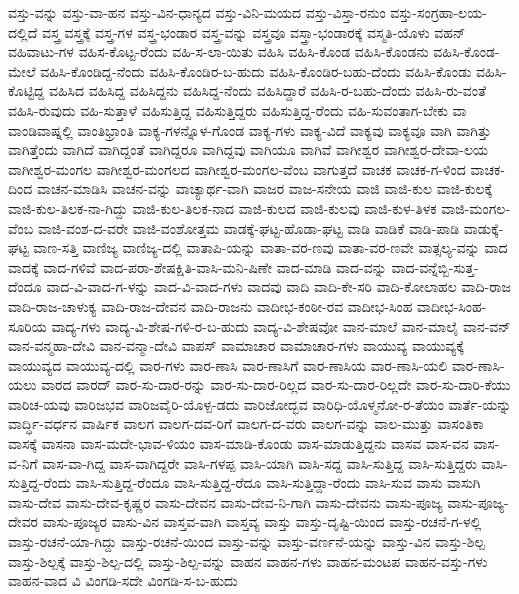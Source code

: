 ವಸ್ತು-ವನ್ನು
ವಸ್ತು-ವಾ-ಹನ
ವಸ್ತು-ವಿನ-ಧಾನ್ಯದ
ವಸ್ತು-ವಿನಿ-ಮಯದ
ವಸ್ತು-ವಿಸ್ತಾ-ರನುಂ
ವಸ್ತು-ಸಂಗ್ರಹಾ-ಲಯ-ದಲ್ಲಿದೆ
ವಸ್ತ್ರ
ವಸ್ತ್ರಕ್ಕೆ
ವಸ್ತ್ರ-ಗಳ
ವಸ್ತ್ರ-ಭಂಡಾರ
ವಸ್ತ್ರ-ವನ್ನು
ವಸ್ತ್ರವೂ
ವಸ್ತ್ರಾ-ಭಂಡಾರಕ್ಕೆ
ವಸ್ಮತಿ-ಯೊಳು
ವಹನ್
ವಹಿವಾಟು-ಗಳ
ವಹಿಸ-ಕೊಟ್ಟ-ರೆಂದು
ವಹಿ-ಸ-ಲಾ-ಯಿತು
ವಹಿಸಿ
ವಹಿಸಿ-ಕೊಂಡ
ವಹಿಸಿ-ಕೊಂಡನು
ವಹಿಸಿ-ಕೊಂಡ-ಮೇಲೆ
ವಹಿಸಿ-ಕೊಂಡಿದ್ದ-ನೆಂದು
ವಹಿಸಿ-ಕೊಂಡಿರ-ಬ-ಹುದು
ವಹಿಸಿ-ಕೊಂಡಿರ-ಬಹು-ದೆಂದು
ವಹಿಸಿ-ಕೊಂಡು
ವಹಿಸಿ-ಕೊಟ್ಟಿದ್ದ
ವಹಿಸಿದ
ವಹಿಸಿದ್ದ
ವಹಿಸಿದ್ದನು
ವಹಿಸಿದ್ದ-ನೆಂದು
ವಹಿಸಿದ್ದಾರೆ
ವಹಿಸಿ-ರ-ಬಹು-ದೆಂದು
ವಹಿಸಿ-ರು-ವಂತೆ
ವಹಿಸಿ-ರುವುದು
ವಹಿ-ಸುತ್ತಾಳೆ
ವಹಿಸುತ್ತಿದ್ದ
ವಹಿಸುತ್ತಿದ್ದರು
ವಹಿಸುತ್ತಿದ್ದ-ರೆಂದು
ವಹಿ-ಸುವಂತಾಗ-ಬೇಕು
ವಾ
ವಾಂಡಿವಾಷ್ನಲ್ಲಿ
ವಾಂತಿಭ್ರಾಂತಿ
ವಾಕ್ಯ-ಗಳನ್ನೊಳ-ಗೊಂಡ
ವಾಕ್ಯ-ಗಳು
ವಾಕ್ಯ-ವಿದೆ
ವಾಕ್ಯವು
ವಾಕ್ಯವೂ
ವಾಗಿ
ವಾಗಿತ್ತು
ವಾಗಿತ್ತೆಂದು
ವಾಗಿದೆ
ವಾಗಿದ್ದಂತೆ
ವಾಗಿದ್ದರೂ
ವಾಗಿದ್ದವು
ವಾಗಿಯೂ
ವಾಗಿವೆ
ವಾಗೀಶ್ವರ
ವಾಗೀಶ್ವರ-ದೇವಾ-ಲಯ
ವಾಗೀಶ್ವರ-ಮಂಗಲ
ವಾಗೀಶ್ವರ-ಮಂಗಲದ
ವಾಗೀಶ್ವರ-ಮಂಗಲ-ವೆಂಬ
ವಾಗುತ್ತದೆ
ವಾಚಕ
ವಾಚಕ-ಗ-ಳಿಂದ
ವಾಚಕ-ದಿಂದ
ವಾಚನ-ಮಾಡಿಸಿ
ವಾಚನ-ವನ್ನು
ವಾಚ್ಯಾರ್ಥ-ವಾಗಿ
ವಾಜರ
ವಾಜ-ಸನೇಯ
ವಾಜಿ
ವಾಜಿ-ಕುಲ
ವಾಜಿ-ಕುಲಕ್ಕೆ
ವಾಜಿ-ಕುಲ-ತಿಲಕ-ನಾ-ಗಿದ್ದು
ವಾಜಿ-ಕುಲ-ತಿಲಕ-ನಾದ
ವಾಜಿ-ಕುಲದ
ವಾಜಿ-ಕುಲವು
ವಾಜಿ-ಕುಳ-ತಿಳಕ
ವಾಜಿ-ಮಂಗಲ-ವೆಂಬ
ವಾಜಿ-ವಂಶ-ದ-ವರೇ
ವಾಜಿ-ವಂಶೋತ್ತಮ
ವಾಡಕ್ಕೆ-ಘಟ್ಟ-ಹೊಡಾ-ಘಟ್ಟ
ವಾಡಿ
ವಾಡಿಕೆ
ವಾಡಿ-ಪಾಡಿ
ವಾಡುಕ್ಕೆ-ಘಟ್ಟ
ವಾಣ-ಸತ್ತಿ
ವಾಣಿಜ್ಯ
ವಾಣಿಜ್ಯ-ದಲ್ಲಿ
ವಾತಾಪಿ-ಯನ್ನು
ವಾತಾ-ವರ-ಣವು
ವಾತಾ-ವರ-ಣವೇ
ವಾತ್ಸಲ್ಯ-ವನ್ನು
ವಾದ
ವಾದಕ್ಕೆ
ವಾದ-ಗಳಿವೆ
ವಾದ-ಪರಾ-ಶೇಷಕ್ಷಿತಿ-ವಾಸಿ-ಮನಿ-ಷಿಣೇ
ವಾದ-ಮಾಡಿ
ವಾದ-ವನ್ನು
ವಾದ-ವನ್ನೆಬ್ಬಿ-ಸುತ್ತ-ದೆಂದೂ
ವಾದ-ವಿ-ವಾದ-ಗ-ಳನ್ನು
ವಾದ-ವಿ-ವಾದ-ಗಳು
ವಾದವು
ವಾದಿ
ವಾದಿ-ಕೇ-ಸರಿ
ವಾದಿ-ಕೋಲಾಹಲ
ವಾದಿ-ರಾಜ
ವಾದಿ-ರಾಜ-ಚಾಳುಕ್ಯ
ವಾದಿ-ರಾಜ-ದೇವನ
ವಾದಿ-ರಾಜನು
ವಾದೀಭ-ಕಂಠೀ-ರವ
ವಾದೀಭ-ಸಿಂಹ
ವಾದೀಭ-ಸಿಂಹ-ಸೂರಿಯ
ವಾದ್ಯ-ಗಳು
ವಾದ್ಯ-ವಿ-ಶೇಷ-ಗಳಿ-ರ-ಬ-ಹುದು
ವಾದ್ಯ-ವಿ-ಶೇಷವೋ
ವಾನ-ಮಾಲೆ
ವಾನ-ಮಾಲೈ
ವಾನ-ವನ್
ವಾನ-ವನ್ಮಹಾ-ದೇವಿ
ವಾನ-ವನ್ಮಾ-ದೇವಿ
ವಾಪಸ್
ವಾಮಾಚಾರ
ವಾಮಾಚಾರ-ಗಳು
ವಾಯುವ್ಯ
ವಾಯುವ್ಯಕ್ಕೆ
ವಾಯುವ್ಯದ
ವಾಯುವ್ಯ-ದಲ್ಲಿ
ವಾರ-ಗಳು
ವಾರ-ಣಾಸಿ
ವಾರ-ಣಾಸಿಗೆ
ವಾರ-ಣಾಸಿಯ
ವಾರ-ಣಾಸಿ-ಯಲಿ
ವಾರ-ಣಾಸಿ-ಯಲು
ವಾರದ
ವಾರದ್
ವಾರ-ಸು-ದಾರ-ರನ್ನು
ವಾರ-ಸು-ದಾರ-ರಿಲ್ಲದ
ವಾರ-ಸು-ದಾರ-ರಿಲ್ಲದೇ
ವಾರ-ಸು-ದಾರಿ-ಕೆಯು
ವಾರಿಚ-ಯವು
ವಾರಿಜಭವ
ವಾರಿಜವೈರಿ-ಯೊಳ್ಪ-ಡದು
ವಾರಿಜೋದ್ಭವ
ವಾರಿಧಿ-ಯೊಳ್ಮನೋ-ರ-ತೆಯಂ
ವಾರ್ತೆ-ಯನ್ನು
ವಾರ್ದ್ಧಿ-ವರ್ಧನ
ವಾರ್ಷಿಕ
ವಾಲಗ
ವಾಲಗ-ದವ-ರಿಗೆ
ವಾಲಗ-ದ-ವರು
ವಾಲಗ-ವನ್ನು
ವಾಲ-ಮುತ್ತು
ವಾಸಂತಿಕಾ
ವಾಸಕ್ಕೆ
ವಾಸನಾ
ವಾಸ-ಮದೇ-ಭಾವ-ಳಿಯಂ
ವಾಸ-ಮಾಡಿ-ಕೊಂಡು
ವಾಸ-ಮಾಡುತ್ತಿದ್ದನು
ವಾಸವ
ವಾಸ-ವನ
ವಾಸ-ವ-ನಿಗೆ
ವಾಸ-ವಾ-ಗಿದ್ದ
ವಾಸ-ವಾಗಿದ್ದರೇ
ವಾಸಿ-ಗಳಪ್ಪ
ವಾಸಿ-ಯಾಗಿ
ವಾಸಿ-ಸದ್ದ
ವಾಸಿ-ಸುತ್ತಿದ್ದ
ವಾಸಿ-ಸುತ್ತಿದ್ದರು
ವಾಸಿ-ಸುತ್ತಿದ್ದ-ರೆಂದು
ವಾಸಿ-ಸುತ್ತಿದ್ದ-ರೆಂದೂ
ವಾಸಿ-ಸುತ್ತಿದ್ದ-ರೆದೂ
ವಾಸಿ-ಸುತ್ತಿದ್ದಾ-ರೆಂದು
ವಾಸಿ-ಸುವ
ವಾಸು
ವಾಸುಗಿ
ವಾಸು-ದೇವ
ವಾಸು-ದೇವ-ಕೃಷ್ಣರ
ವಾಸು-ದೇವನ
ವಾಸು-ದೇವ-ನಿ-ಗಾಗಿ
ವಾಸು-ದೇವನು
ವಾಸು-ಪೂಜ್ಯ
ವಾಸು-ಪೂಜ್ಯ-ದೇವರ
ವಾಸು-ಪೂಜ್ಯರ
ವಾಸು-ವಿನ
ವಾಸ್ತವ-ವಾಗಿ
ವಾಸ್ತವ್ಯ
ವಾಸ್ತು
ವಾಸ್ತು-ದೃಷ್ಟಿ-ಯಿಂದ
ವಾಸ್ತು-ರಚನೆ-ಗ-ಳಲ್ಲಿ
ವಾಸ್ತು-ರಚನೆ-ಯಾ-ಗಿದ್ದು
ವಾಸ್ತು-ರಚನೆ-ಯಿಂದ
ವಾಸ್ತು-ವನ್ನು
ವಾಸ್ತು-ವರ್ಣನೆ-ಯನ್ನು
ವಾಸ್ತು-ವಿನ
ವಾಸ್ತು-ಶಿಲ್ಪ
ವಾಸ್ತು-ಶಿಲ್ಪಕ್ಕೆ
ವಾಸ್ತು-ಶಿಲ್ಪ-ದಲ್ಲಿ
ವಾಸ್ತು-ಶಿಲ್ಪ-ವನ್ನು
ವಾಹನ
ವಾಹನ-ಗಳು
ವಾಹನ-ಮಂಟಪ
ವಾಹನ-ವಸ್ತು-ಗಳು
ವಾಹನ-ವಾದ
ವಿ
ವಿಂಗಡಿ-ಸದೇ
ವಿಂಗಡಿ-ಸ-ಬ-ಹುದು
